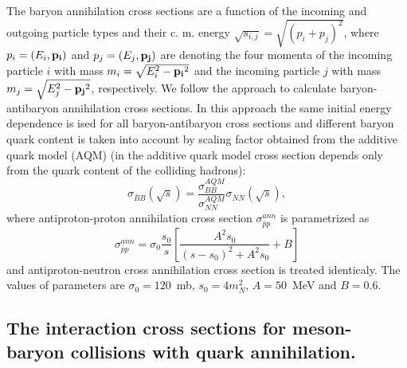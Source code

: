 \hspace{1.0em}The baryon annihilation cross sections are a function of
the incoming and outgoing particle types and their c. m. energy
$\sqrt{s_{i,j}} = \sqrt{(p_i + p_j)^2}$, where $p_i = (E_i, {\bf p_i})$
and $p_j=(E_j, {\bf p_j})$ are denoting the four momenta of the incoming
particle $i$ with mass $m_i = \sqrt{E^2_i - {\bf p_i}^2}$ and the
incoming particle $j$ with mass $m_j = \sqrt{E^2_j - {\bf p_j}^2}$,
respectively.  We follow the approach \cite{URQMD97} to calculate 
 baryon-antibaryon annihilation cross sections. In this approach the same 
 initial energy dependence is ised for all baryon-antibaryon cross sections 
 and different baryon quark content is taken into account by scaling 
 factor obtained from the additive quark model (AQM)\cite{Goulianos83} 
 (in the additive quark model cross section depends only
from the quark content of the colliding hadrons): 
\begin{equation}
\label{CCS10}\sigma_{\bar{B}B}(\sqrt{s})=\frac{\sigma^{AQM}_{BB}}
{\sigma^{AQM}_{NN}}
\sigma_{\bar{N}N}(\sqrt{s}),
\end{equation} 
where antiproton-proton annihilation cross section $\sigma^{ann}_{\bar{p}p}$ 
is parametrized as \cite{KD89}
\begin{equation}
\label{CCS11}\sigma^{ann}_{\bar{p}p}=\sigma_{0}\frac{s_0}{s}[\frac{A^2s_0}
{(s-s_0)^2+A^2s_0}+B]
\end{equation}
and antiproton-neutron cross annihilation cross section is treated identicaly.
The values of parameters are $\sigma_{0}=120$\ mb, $s_0=4m^2_{N}$, 
$A=50$\ MeV and $B=0.6$. 

\subsection{The interaction cross sections for 
meson-baryon collisions with quark annihilation.}

